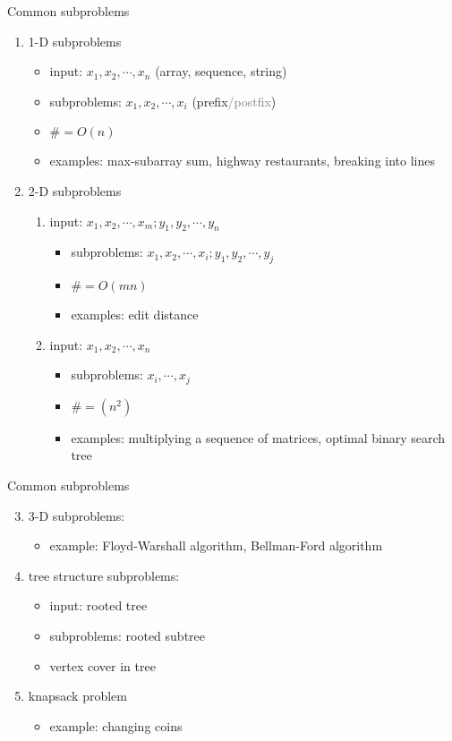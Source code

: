 \begin{frame}{Common subproblems}
  \begin{enumerate}
    \item 1-D subproblems 
      \begin{itemize}
	\item input: $x_{1}, x_{2}, \cdots, x_{n}$ (array, sequence, string)
	\item subproblems: $x_{1}, x_{2}, \cdots, x_{i}$ (prefix\textcolor{gray}{/postfix})
	\item $\# = O(n)$
	\item examples: max-subarray sum, highway restaurants, breaking into lines
      \end{itemize}
    \item 2-D subproblems
      \begin{enumerate}
	\item input: $x_{1}, x_{2}, \cdots, x_{m}; y_{1}, y_{2}, \cdots, y_{n}$
	\begin{itemize}
	  \item subproblems: $x_{1}, x_{2}, \cdots, x_{i}; y_{1}, y_{2}, \cdots, y_{j}$
	  \item $\# = O(mn)$
	  \item examples: edit distance
	\end{itemize}
	\item input: $x_{1}, x_{2}, \cdots, x_{n}$
	\begin{itemize}
	  \item subproblems: $x_{i}, \cdots, x_{j}$
	  \item $\# = (n^{2})$
	  \item examples: multiplying a sequence of matrices, optimal binary search tree
	\end{itemize}
      \end{enumerate}
  \end{enumerate}
\end{frame}
\begin{frame}{Common subproblems}
  \begin{enumerate}
    \setcounter{enumi}{2}
    \item 3-D subproblems:
      \begin{itemize}
	\item example: Floyd-Warshall algorithm, Bellman-Ford algorithm
      \end{itemize}
    \item tree structure subproblems:
      \begin{itemize}
	\item input: rooted tree
	\item subproblems: rooted subtree
	\item vertex cover in tree
      \end{itemize}
    \item knapsack problem
      \begin{itemize}
	\item example: changing coins
      \end{itemize}
  \end{enumerate}
\end{frame}
